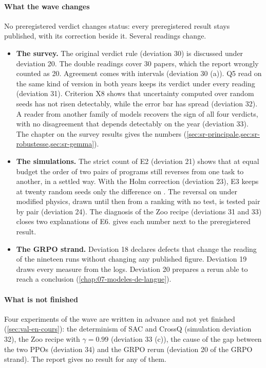 \paragraph{What the wave changes} No preregistered verdict changes status: every preregistered result
stays published, with its correction beside it. Several readings change.
\begin{itemize}
  \item \textbf{The survey.} The original verdict rule (deviation 30) is discussed under deviation 20.
        The double readings cover 30 papers, which the report wrongly counted as 20. Agreement comes
        with intervals (deviation 30 (a)). Q5 read on the same kind of version in both years
        keeps its verdict under every reading (deviation 31). Criterion X8 shows that uncertainty
        computed over random seeds has not risen detectably, while the error bar has spread
        (deviation 32). A reader from another family of models recovers the sign of all four
        verdicts, with no disagreement that depends detectably on the year (deviation 33). The
        chapter on the survey results gives the numbers
        (\cref{sec:sr-principale,sec:sr-robustesse,sec:sr-gemma}).
  \item \textbf{The simulations.} The strict count of E2 (deviation 21) shows that at equal budget
        the order of two pairs of programs still reverses from one task to another, in a settled
        way. With the Holm correction (deviation 23), E3 keeps at twenty random seeds only the
        difference on . The reversal on  under modified physics, drawn
        until then from a ranking with no test, is tested pair by pair (deviation 24). The
        diagnosis of the Zoo recipe (deviations 31 and 33) closes two explanations of E6.
         gives each number next to the preregistered result.
  \item \textbf{The GRPO strand.} Deviation 18 declares defects that change the reading of the
        nineteen runs without changing any published figure. Deviation 19 draws every measure from
        the logs. Deviation 20 prepares a rerun able to reach a conclusion
        (\cref{chap:07-modeles-de-langue}).
\end{itemize}

\paragraph{What is not finished} Four experiments of the wave are written in advance and not yet
finished (\cref{sec:val-en-cours}): the determinism of SAC and CrossQ (simulation deviation 32), the Zoo
recipe with $\gamma = 0.99$ (deviation 33 (c)), the cause of the gap between the two PPOs (deviation
34) and the GRPO rerun (deviation 20 of the GRPO strand). The report gives no result for any of them.


